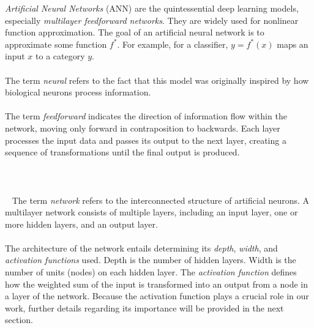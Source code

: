 \documentclass[../main.tex]{subfiles}
\begin{document}
	 
	 \noindent \textit{Artificial Neural Networks} (ANN) are the quintessential deep learning models, especially \textit{multilayer feedforward networks}. They are widely used for nonlinear function approximation. The goal of an artificial neural network is to approximate some function $f^*$. For example, for a classifier, $y = f^*(x)$ maps an input $x$ to a category $y$.  \\ \\ 
	 \noindent The term \textit{neural} refers  to the fact that this model was originally inspired by how biological neurons process information. \\ \\ 
	 \noindent The term \textit{feedforward} indicates the direction of information flow within the network, moving only forward in contraposition to backwards. Each layer processes the input data and passes its output to the next layer, creating a sequence of transformations until the final output is produced. \\ \\ \\ \\ 
	 \noindent The term \textit{network} refers to the interconnected structure of artificial neurons. A multilayer network consists of multiple layers, including an input layer, one or more hidden layers, and an output layer. \\ \\ %
	 \noindent The architecture of the network entails determining its \textit{depth}, \textit{width}, and \textit{activation functions} used. Depth is the number of hidden layers. Width is the number of units (nodes) on each hidden layer. The \textit{activation function} defines how the weighted sum of the input is transformed into an output from a node in a layer of the network. Because the activation function plays a crucial role in our work, further details regarding its importance will be provided in the next section.
	 
\end{document}
